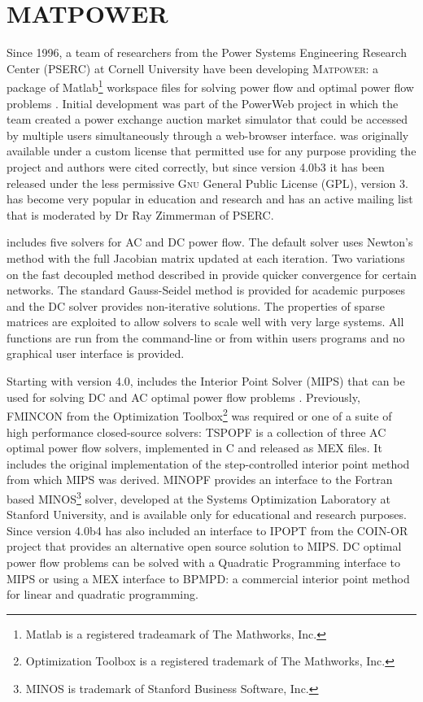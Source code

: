 \section{MATPOWER}
Since 1996, a team of researchers from the Power Systems Engineering Research
Center (PSERC) at Cornell University have been developing \textsc{Matpower}: a
package of Matlab\footnote{Matlab is a registered tradeamark of The Mathworks,
Inc.} workspace files for solving power flow and optimal power flow problems
\cite{zimmerman:mp_pes}. Initial development was part of the PowerWeb project in
which the team created a power exchange auction market simulator that could be
accessed by multiple users simultaneously through a web-browser interface.
\matpower was originally available under a custom license that permitted use for
any purpose providing the project and authors were cited correctly, but since
version 4.0b3 it has been released under the less permissive \textsc{Gnu}
General Public License (GPL), version 3. \matpower has become very popular in
education and research and has an active mailing list that is moderated by Dr
Ray Zimmerman of PSERC.

\matpower includes five solvers for AC and DC power flow.  The
default solver uses Newton's method \cite{tinney:67} with the full Jacobian
matrix updated at each iteration.  Two variations on the fast decoupled method
\cite{stott:74} described in  provide quicker convergence
for certain networks.  The standard Gauss-Seidel method \cite{glimn:57} is provided
for academic purposes and the DC solver provides non-iterative
solutions.  The properties of \matlab sparse matrices are exploited to
allow solvers to scale well with very large systems.  All functions are run
from the \matlab command-line or from within users programs and no graphical
user interface is provided.

Starting with version 4.0, \matpower includes the \matlab Interior Point Solver
(MIPS) that can be used for solving DC and AC optimal power flow problems
\cite{zimmerman:ccv}.  Previously, FMINCON from the \matlab Optimization
Toolbox\footnote{Optimization Toolbox is a registered trademark of The
Mathworks, Inc.} was required or one of a suite of high performance
closed-source solvers:  TSPOPF is a collection of three AC optimal power flow
solvers, implemented in C and released as \matlab MEX
files.  It includes the original implementation of the step-controlled interior
point method from which MIPS was derived.  MINOPF provides an interface to the
Fortran based MINOS\footnote{MINOS is trademark of Stanford Business Software,
Inc.} solver, developed at the Systems Optimization Laboratory at Stanford
University, and is available only for educational and research purposes. Since
version 4.0b4 \matpower has also included an interface to IPOPT from the COIN-OR
project that provides an alternative open source solution to MIPS.  DC optimal
power flow problems can be solved with a Quadratic Programming interface to MIPS
or using a MEX interface to BPMPD: a commercial interior point method for linear
and quadratic programming.

